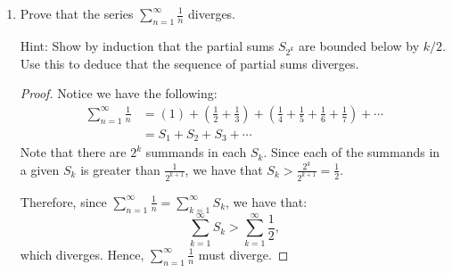 \documentclass[12pt]{amsart}
\begin{document}
\begin{enumerate}
\begin{enumerate}
\item $\displaystyle \sum_{n=1}^\infty \big(a_n+b_n \big) = 
\sum_{n=1}^\infty a_n + \sum_{n=1}^\infty b_n$.

\begin{proof}
Since $\sum_{n=1}^\infty a_n$ and $\sum_{n=1}^\infty b_n$ converge, we have two series of partial sums $\{S_N^a\}_{n=1}^\infty$ and $\{S_N^b\}_{n=1}^\infty$ where:
\[ S_N^a = \sum_{n=1}^N a_n \\
\textrm{ and } \\
S_N^b = \sum_{n=1}^N b_n \]
Further, we know that $S_N^a \to S^a$ and $S_N^b \to S^b$ as $n \to \infty$.

We know from the arithmetic of series that:
\[ \{S_N^a\}_{n=1}^\infty + \{S_N^b\}_{n=1}^\infty =  \{S_N^a + S_N^b\}_{n=1}^\infty, \]
and that $\left(S_N^a + S_N^b\right) \to \left(S^a + S^b\right)$ as $n\to\infty$. It follows that:
\[\sum_{n=1}^\infty a_n + \sum_{n=1}^\infty b_n =
 \sum_{n=1}^\infty \big(a_n+b_n \big). \]
\end{proof}

\end{enumerate}

\item Prove that the series $\displaystyle \sum_{n=1}^\infty 
\frac{1}{n}$ diverges.

\medskip

\noindent Hint:  Show by induction that the partial sums $S_{2^k}$ are bounded below by
$k/2$.  Use this to deduce that the sequence of partial sums diverges.

\begin{proof}
Notice we have the following:
\begin{align*}
\sum_{n=1}^\infty \frac{1}{n} &= 
\left(1\right) +
\left(\frac{1}{2}+\frac{1}{3}\right) +
\left(\frac{1}{4}+\frac{1}{5}+\frac{1}{6}+\frac{1}{7}\right) +
\cdots \\
&= S_1 + S_2 + S_3 + \cdots
\end{align*}
Note that there are $2^k$ summands in each $S_k$. Since each of the summands in a given $S_k$ is greater than $\frac {1} {2^{k+1}}$, we have that $S_k > \frac{2^k}{2^{k+1}}=\frac 1 2$.

Therefore, since $\sum_{n=1}^\infty \frac{1}{n} = \sum_{k=1}^\infty S_k$, we have that:
\[ \sum_{k=1}^\infty S_k > \sum_{k=1}^\infty \frac{1}{2}, \]
which diverges. Hence, $\sum_{n=1}^\infty \frac{1}{n}$ must diverge.
\end{proof}


\end{enumerate}
\end{document}
